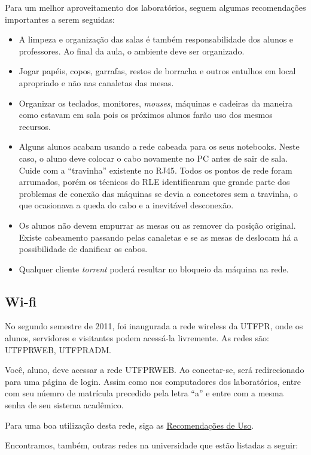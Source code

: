\documentclass[a4paper,12pt,openany]{article}
\begin{document}
Para um melhor aproveitamento dos laboratórios, seguem algumas recomendações importantes a serem seguidas:

\begin{itemize}
\item A limpeza e organização das salas é também responsabilidade dos alunos e professores. Ao final da aula, o ambiente deve ser organizado.
\item Jogar papéis, copos, garrafas, restos de borracha e outros entulhos em local apropriado e não nas canaletas das mesas.
\item Organizar os teclados, monitores, \textit{mouses}, máquinas e cadeiras da maneira como estavam em sala pois os próximos alunos farão uso dos mesmos recursos.
\item Alguns alunos acabam usando a rede cabeada para os seus notebooks. Neste caso, o aluno deve colocar o cabo novamente no PC antes de sair de sala. Cuide com a ``travinha'' existente no RJ45. Todos os pontos de rede foram arrumados, porém os técnicos do RLE identificaram que grande  parte dos problemas de conexão das máquinas se devia a conectores sem a travinha, o que ocasionava a queda do cabo e a inevitável desconexão.
\item Os alunos não devem empurrar as mesas ou as remover da posição original. Existe cabeamento passando pelas canaletas e se as mesas de deslocam há a possibilidade de danificar os cabos.
\item Qualquer cliente \textit{torrent} poderá resultar no bloqueio da máquina na rede.
\end{itemize}

\subsection{Wi-fi}
No segundo semestre de 2011, foi inaugurada a rede wireless da UTFPR, onde os alunos, servidores e visitantes podem acessá-la livremente. As redes são: UTFPRWEB, UTFPRADM.

Você, aluno, deve acessar a rede UTFPRWEB. Ao conectar-se, será redirecionado para uma página de login. Assim como nos computadores dos laboratórios, entre com seu núemro de matrícula precedido pela letra ``a'' e entre com a mesma senha de seu sistema acadêmico.

Para uma boa utilização desta rede, siga as \href{http://www.utfpr.edu.br/estrutura-universitaria/diretorias-de-gestao/dirgti/servicos/recomendacoes}{Recomendações de Uso}.

Encontramos, também, outras redes na universidade que estão listadas a seguir:
\end{document}
